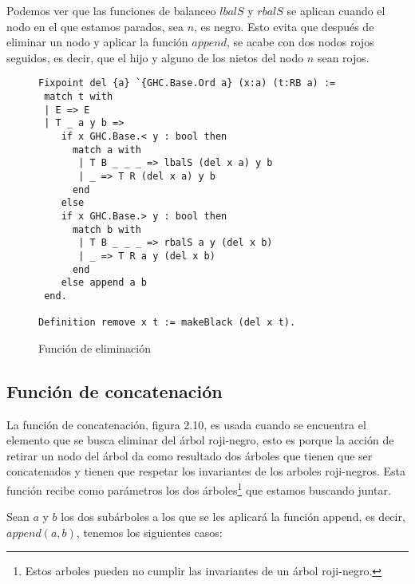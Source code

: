 \documentclass[letterpaper,12pt,oneside]{book}
\newcommand{\arn}{árbol roji-negro}
\newcommand{\arns}{arboles roji-negros}
\theoremstyle{plain}
\theoremstyle{definition}
\theoremstyle{remark}
\begin{document}
Podemos ver que las funciones de balanceo $lbalS$ y $rbalS$ se aplican cuando el nodo en el que estamos 
parados, sea $n$, es negro. Esto evita que después de eliminar un nodo y aplicar la funci\'on $append$, 
se acabe con dos nodos rojos seguidos, es decir, que el hijo y alguno de los nietos del nodo $n$ sean 
rojos.  

\begin{figure}
\centering 
\captionsetup{justification=centering}
\begin{verbatim}
Fixpoint del {a} `{GHC.Base.Ord a} (x:a) (t:RB a) :=
 match t with
 | E => E
 | T _ a y b =>
    if x GHC.Base.< y : bool then 
      match a with
       | T B _ _ _ => lbalS (del x a) y b
       | _ => T R (del x a) y b
      end
    else 
    if x GHC.Base.> y : bool then 
      match b with
       | T B _ _ _ => rbalS a y (del x b)
       | _ => T R a y (del x b)
      end
    else append a b
 end.

Definition remove x t := makeBlack (del x t).
\end{verbatim}
\caption{Función de eliminación}
\end{figure}

\subsection{Funci\'on de concatenaci\'on}

La funci\'on de concatenación, figura 2.10, es usada cuando se encuentra el elemento que se busca 
eliminar del {\arn}, esto es porque la acci\'on de retirar un nodo del \'arbol da como resultado dos 
\'arboles que tienen que ser concatenados y tienen que respetar los invariantes de los {\arns}. Esta 
funci\'on recibe como parámetros los dos \'arboles\footnote{Estos arboles pueden no cumplir las 
invariantes de un {\arn}.} que estamos buscando juntar. 

Sean $a$ y $b$ los dos subárboles a los que se les aplicar\'a la funci\'on append, es decir, 
$append(a,b)$, tenemos los siguientes casos:
\end{document}
